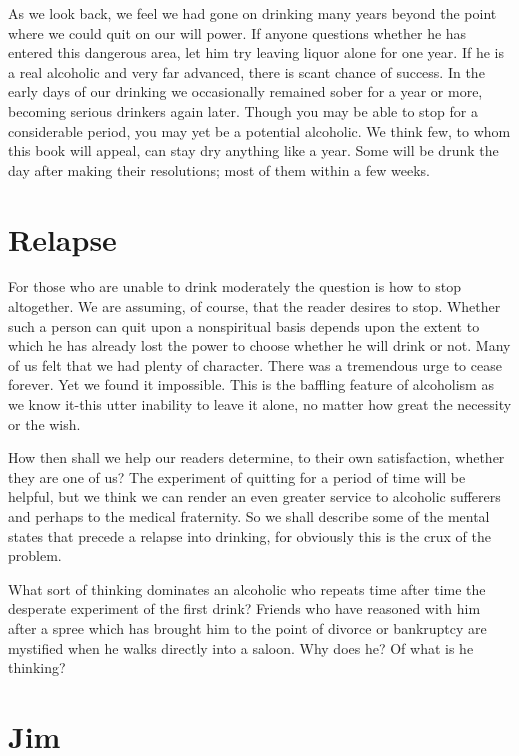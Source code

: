 As we look back, 
we feel we had gone on drinking many years beyond the point where we could quit on our will power. 
If anyone questions whether he has entered this dangerous area, 
let him try leaving liquor alone for one year. 
If he is a real alcoholic and very far advanced, there is scant chance of success. 
In the early days of our drinking we occasionally remained sober for a year or more, 
becoming serious drinkers again later. 
Though you may be able to stop for a considerable period, you may yet be a potential alcoholic. 
We think few, to whom this book will appeal, can stay dry anything like a year. 
Some will be drunk the day after making their resolutions; 
most of them within a few weeks.


\section{Relapse}

For those who are unable to drink moderately the question is how to stop altogether. 
We are assuming, of course, that the reader desires to stop. 
Whether such a person can quit upon a nonspiritual basis 
depends upon the extent to which he has already lost the power to choose whether he will drink or not. 
Many of us felt that we had plenty of character. 
There was a tremendous urge to cease forever. 
Yet we found it impossible. 
This is the baffling feature of alcoholism as we know it-this utter inability to leave it alone, 
no matter how great the necessity or the wish.

How then shall we help our readers determine, to their own satisfaction, 
whether they are one of us? 
The experiment of quitting for a period of time will be helpful, 
but we think we can render an even greater service to alcoholic sufferers 
and perhaps to the medical fraternity. 
So we shall describe some of the mental states that precede a relapse into drinking, 
for obviously this is the crux of the problem.

What sort of thinking dominates an alcoholic who repeats time after time the desperate experiment of the first drink? 
Friends who have reasoned with him after a spree which has brought him to the point of divorce or bankruptcy 
are mystified when he walks directly into a saloon. 
Why does he? 
Of what is he thinking?


\section{Jim}

